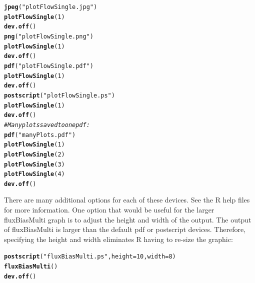 \documentclass[a4paper,11pt]{article}\usepackage[]{graphicx}\usepackage[]{color}
\makeatletter
\newcommand{\hlnum}[1]{\textcolor[rgb]{0.686,0.059,0.569}{#1}}%
\newcommand{\hlstr}[1]{\textcolor[rgb]{0.192,0.494,0.8}{#1}}%
\newcommand{\hlcom}[1]{\textcolor[rgb]{0.678,0.584,0.686}{\textit{#1}}}%
\newcommand{\hlstd}[1]{\textcolor[rgb]{0.345,0.345,0.345}{#1}}%
\newcommand{\hlkwc}[1]{\textcolor[rgb]{0.333,0.667,0.333}{#1}}%
\newcommand{\hlkwd}[1]{\textcolor[rgb]{0.737,0.353,0.396}{\textbf{#1}}}%
\newenvironment{kframe}{%
 \def\at@end@of@kframe{}%
 \ifinner\ifhmode%
  \def\at@end@of@kframe{\end{minipage}}%
  \begin{minipage}{\columnwidth}%
 \fi\fi%
 \def\FrameCommand##1{\hskip\@totalleftmargin \hskip-\fboxsep
 \colorbox{shadecolor}{##1}\hskip-\fboxsep
     \hskip-\linewidth \hskip-\@totalleftmargin \hskip\columnwidth}%
 \MakeFramed {\advance\hsize-\width
   \@totalleftmargin\z@ \linewidth\hsize
   \@setminipage}}%
 {\par\unskip\endMakeFramed%
 \at@end@of@kframe}
\newenvironment{knitrout}{}{} %
\makeatother
\begin{document}
\begin{knitrout}
\color{fgcolor}\begin{kframe}
\begin{alltt}
\hlkwd{jpeg}\hlstd{(}\hlstr{"plotFlowSingle.jpg"}\hlstd{)}
\hlkwd{plotFlowSingle}\hlstd{(}\hlnum{1}\hlstd{)}
\hlkwd{dev.off}\hlstd{()}
\hlkwd{png}\hlstd{(}\hlstr{"plotFlowSingle.png"}\hlstd{)}
\hlkwd{plotFlowSingle}\hlstd{(}\hlnum{1}\hlstd{)}
\hlkwd{dev.off}\hlstd{()}
\hlkwd{pdf}\hlstd{(}\hlstr{"plotFlowSingle.pdf"}\hlstd{)}
\hlkwd{plotFlowSingle}\hlstd{(}\hlnum{1}\hlstd{)}
\hlkwd{dev.off}\hlstd{()}
\hlkwd{postscript}\hlstd{(}\hlstr{"plotFlowSingle.ps"}\hlstd{)}
\hlkwd{plotFlowSingle}\hlstd{(}\hlnum{1}\hlstd{)}
\hlkwd{dev.off}\hlstd{()}
\hlcom{#Many plots saved to one pdf:}
\hlkwd{pdf}\hlstd{(}\hlstr{"manyPlots.pdf"}\hlstd{)}
\hlkwd{plotFlowSingle}\hlstd{(}\hlnum{1}\hlstd{)}
\hlkwd{plotFlowSingle}\hlstd{(}\hlnum{2}\hlstd{)}
\hlkwd{plotFlowSingle}\hlstd{(}\hlnum{3}\hlstd{)}
\hlkwd{plotFlowSingle}\hlstd{(}\hlnum{4}\hlstd{)}
\hlkwd{dev.off}\hlstd{()}
\end{alltt}
\end{kframe}
\end{knitrout}


There are many additional options for each of these devices. See the R help files for more information. One option that would be useful for the larger fluxBiasMulti graph is to adjust the height and width of the output. The output of fluxBiasMulti is larger than the default pdf or postscript devices. Therefore, specifying the height and width eliminates R having to re-size the graphic:

\begin{knitrout}
\color{fgcolor}\begin{kframe}
\begin{alltt}
\hlkwd{postscript}\hlstd{(}\hlstr{"fluxBiasMulti.ps"}\hlstd{,} \hlkwc{height}\hlstd{=}\hlnum{10}\hlstd{,}\hlkwc{width}\hlstd{=}\hlnum{8}\hlstd{)}
\hlkwd{fluxBiasMulti}\hlstd{()}
\hlkwd{dev.off}\hlstd{()}
\end{alltt}
\end{kframe}
\end{knitrout}
\end{document}
